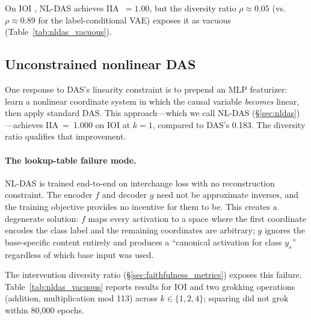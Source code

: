 \documentclass{article}
\begin{document}
On IOI \citep{wang2022interpretability}, NL-DAS achieves IIA~$= 1.00$,
but the diversity ratio $\rho \approx 0.05$ (vs.\ $\rho \approx 0.89$ for the
label-conditional VAE) exposes it as vacuous (Table~\ref{tab:nldas_vacuous}).

\subsection{Unconstrained nonlinear DAS}
\label{sec:nldas_vacuous}

One response to DAS's linearity constraint is to prepend an MLP
featurizer: learn a nonlinear coordinate system in which the causal variable
\emph{becomes} linear, then apply standard DAS. This approach---which we call
NL-DAS (\S\ref{sec:nldas})---achieves IIA~=~1.000 on IOI at $k = 1$, compared
to DAS's 0.183. The diversity ratio qualifies that improvement.

\paragraph{The lookup-table failure mode.}
NL-DAS is trained end-to-end on interchange loss with no reconstruction
constraint. The encoder $f$ and decoder $g$ need not be approximate inverses,
and the training objective provides no incentive for them to be. This creates a
degenerate solution: $f$ maps every activation to a space where the first
coordinate encodes the class label and the remaining coordinates are arbitrary;
$g$ ignores the base-specific content entirely and produces a ``canonical
activation for class $y_s$'' regardless of which base input was used.

The intervention diversity ratio (\S\ref{sec:faithfulness_metrics}) exposes this
failure. Table~\ref{tab:nldas_vacuous} reports results for IOI and two
grokking operations (addition, multiplication mod 113) across $k \in \{1, 2, 4\}$;
squaring did not grok within 80{,}000 epochs.
\end{document}
